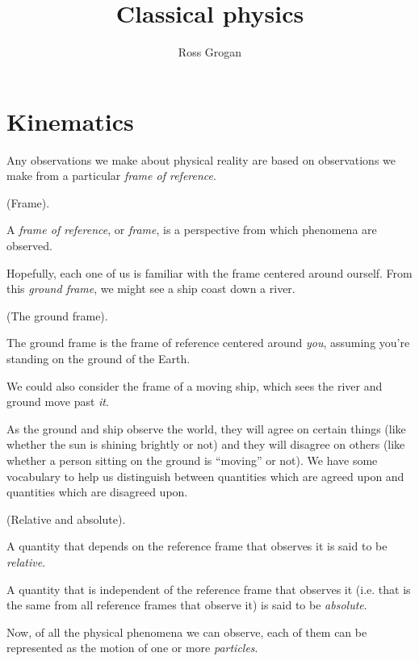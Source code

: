 \documentclass{article}
\title{Classical physics}
\author{Ross Grogan}
\date{}
\begin{document}
\maketitle

\section*{Kinematics}

Any observations we make about physical reality are based on observations we make from a particular \textit{frame of reference}.

\begin{defn}
	(Frame).
	
	A \textit{frame of reference}, or \textit{frame}, is a perspective from which phenomena are observed. 
\end{defn}

Hopefully, each one of us is familiar with the frame centered around ourself. From this \textit{ground frame}, we might see a ship coast down a river.

\begin{defn}
	(The ground frame).
	
	The ground frame is the frame of reference centered around \textit{you}, assuming you're standing on the ground of the Earth.
\end{defn}

We could also consider the frame of a moving ship, which sees the river and ground move past \textit{it}.

As the ground and ship observe the world, they will agree on certain things (like whether the sun is shining brightly or not) and they will disagree on others (like whether a person sitting on the ground is ``moving'' or not). We have some vocabulary to help us distinguish between quantities which are agreed upon and quantities which are disagreed upon.

\begin{defn}
	(Relative and absolute).
	
	A quantity that depends on the reference frame that observes it is said to be \textit{relative}.
	
	A quantity that is independent of the reference frame that observes it (i.e. that is the same from all reference frames that observe it) is said to be \textit{absolute}.
\end{defn}

Now, of all the physical phenomena we can observe, each of them can be represented as the motion of one or more \textit{particles}.
\end{document}
